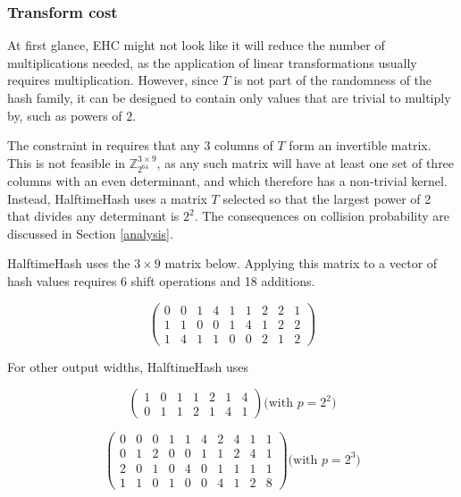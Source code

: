 \documentclass[runningheads]{llncs}
\newcommand{\ints}{\mathbb{Z}}
\begin{document}

\subsubsection{Transform cost}

At first glance, EHC might not look like it will reduce the number of multiplications needed, as the application of linear transformations usually requires multiplication.
However, since $T$ is not part of the randomness of the hash family, it can be designed to contain only values that are trivial to multiply by, such as powers of $2$.

The constraint in \cite{ehc-nandi} requires that any 3 columns of $T$ form an invertible matrix.
This is not feasible in $\ints_{2^{64}}^{3 \times 9}$, as any such matrix will have at least one set of three columns with an even determinant, and which therefore has a non-trivial kernel.
Instead, HalftimeHash uses a matrix $T$ selected so that the largest power of 2 that divides any determinant is $2^2$.
The consequences on collision probability are discussed in Section \ref{analysis}.

HalftimeHash uses the $3 \times 9$ matrix below.
Applying this matrix to a vector of hash values requires 6 shift operations and 18 additions.

\begin{displaymath}
  \left(
\begin{array}{rrrrrrrrr}
  0 & 0 & 1 & 4 & 1 & 1 & 2 & 2 & 1\\
  1 & 1 & 0 & 0 & 1 & 4 & 1 & 2 & 2\\
  1 & 4 & 1 & 1 & 0 & 0 & 2 & 1 & 2
\end{array}
\right)
\end{displaymath}

For other output widths, HalftimeHash uses

\[
\left(
\begin{array}{rrrrrrrrrrrr}
  1 & 0 & 1 & 1 & 2 & 1 & 4\\
  0 & 1 & 1 & 2 & 1 & 4 & 1
\end{array}
\right)
\textrm{(with $p = 2^2$)}
\]

\[
\left(
\begin{array}{rrrrrrrrrr}
 0 & 0 & 0 & 1 & 1 & 4 & 2 & 4 & 1 & 1 \\
 0 & 1 & 2 & 0 & 0 & 1 & 1 & 2 & 4 & 1 \\
 2 & 0 & 1 & 0 & 4 & 0 & 1 & 1 & 1 & 1 \\
 1 & 1 & 0 & 1 & 0 & 0 & 4 & 1 & 2 & 8
\end{array}
\right)
\textrm{(with $p = 2^3$)}
\]
\end{document}

